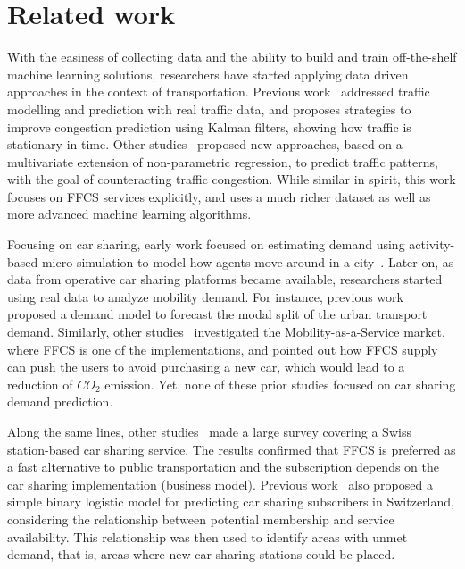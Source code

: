 \section{Related work}
\label{sec:8_2_related_works}

With the easiness of collecting data and the ability to build and train off-the-shelf machine learning solutions, researchers have started applying data driven approaches in the context of transportation.
Previous work~\citep{2_okutani1984dynamic} addressed traffic modelling and prediction with real traffic data, and proposes strategies to improve congestion prediction using Kalman filters, showing how traffic is stationary in time.  
Other studies~\citep{3_clark2003traffic} proposed new approaches, based on a multivariate extension of non-parametric regression, to predict traffic patterns, with the goal of counteracting traffic congestion. 
While similar in spirit, this work focuses on FFCS services explicitly, and uses a much richer dataset as well as more advanced machine learning algorithms.

Focusing on car sharing, early work focused on estimating demand using activity-based micro-simulation to model how agents move around in a city~\citep{Ciari2013}. 
Later on, as data from operative car sharing platforms became available, researchers started using real data to analyze mobility demand. For instance, previous work~\citep{catalano2008car,Firnkorn2011} proposed a demand model to forecast the modal split of the urban transport demand. Similarly, other studies~\citep{Firnkorn2012} investigated the Mobility-as-a-Service market, where FFCS is one of the implementations, and pointed out how FFCS supply can push the users to avoid purchasing a new car, which would lead to a reduction of $CO_{2}$ emission. Yet, none of these prior studies focused on car sharing demand prediction. 

Along the same lines, other studies~\citep{becker:17} made a large survey covering a Swiss station-based car sharing service. The results confirmed that FFCS is preferred as a fast alternative to public transportation and the subscription depends on the car sharing implementation (business model). 
Previous work~\citep{17_ciari2016evaluating} also proposed a simple binary logistic model for predicting car sharing subscribers in Switzerland, considering the relationship between potential membership and service availability. This relationship was then used to identify areas with unmet demand, that is, areas where new car sharing stations could be placed. 


